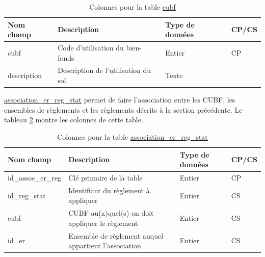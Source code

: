         \begin{table}[h]
           \centering
           \begin{tabular}{m{}|m{}m{}m{}}
                \hline
                Nom champ & Description & Type de données & CP/CS  \\
                \hline
                cubf & Code d'utilisation du bien-fonds & Entier & CP \\  
                description & Description de l'utilisation du sol & Texte & \\
                \hline
           \end{tabular}
           \caption{Colonnes pour la table \underline{cubf}}
           \label{tab:definition_cubf}
        \end{table}   
       \clearpage
        \underline{association\_er\_reg\_stat} permet de faire l'association entre les \ac{CUBF}, les ensembles de règlements et les règlements décrits à la section précédente. Le tableau \ref{tab:definition_association_er_reg_stat} montre les colonnes de cette table.\par
        \begin{table}[h]
           \centering
           \begin{tabular}{m{}|m{}m{}m{}}
                \hline
                Nom champ & Description & Type de données & CP/CS  \\
                \hline
                id\_assoc\_er\_reg & Clé primaire de la table & Entier & CP \\  
                id\_reg\_stat & Identifiant du règlement à appliquer & Entier & CS \\
                cubf & \ac{CUBF} au(x)quel(s) on doit appliquer le règlement & Entier & CS\\
                id\_er & Ensemble de règlement auquel appartient l'association & Entier & CS\\
                \hline
           \end{tabular}
           \caption{Colonnes pour la table \underline{association\_er\_reg\_stat}}
           \label{tab:definition_association_er_reg_stat}
        \end{table}   
        \FloatBarrier
       
